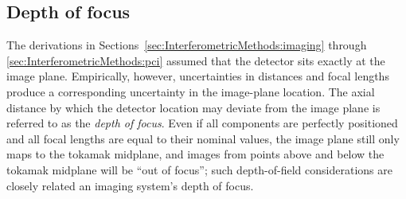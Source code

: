 \subsection{Depth of focus}
\label{sec:DesignConsiderations:geometric:depth_of_focus}
The derivations in
Sections~\ref{sec:InterferometricMethods:imaging} through
\ref{sec:InterferometricMethods:pci}
assumed that the detector sits exactly at the image plane.
Empirically, however, uncertainties in distances and focal lengths
produce a corresponding uncertainty in the image-plane location.
The axial distance by which the detector location may deviate
from the image plane is referred to as the \emph{depth of focus}.
Even if all components are perfectly positioned and
all focal lengths are equal to their nominal values,
the image plane still only maps to the tokamak midplane, and
images from points above and below the tokamak midplane
will be ``out of focus'';
such depth-of-field considerations are closely related
an imaging system's depth of focus.

